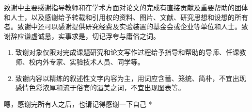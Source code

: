 \acknowledgments
\thispagestyle{fancy}%
致谢中主要感谢指导教师和在学术方面对论文的完成有直接贡献及重要帮助的团体和人士，以及感谢给予转载和引用权的资料、图片、文献、研究思想和设想的所有者。致谢中还可以感谢提供研究经费及实验装置的基金会或企业等单位和人士。致谢辞应谦虚诚恳，实事求是，切记浮夸与庸俗之词。

\begin{enumerate}[label=\arabic*)]
	\item 致谢对象仅限对完成课题研究和论文写作过程给予指导和帮助的导师、任课教师、校内外专家、实验技术人员、同学等。
	\item 致谢内容以精练的叙述性文字内容为主，用词应含蓄、笼统、简朴，不宜出现感情色彩浓厚和流于俗套的溢美之词，不宜出现图表等。
\end{enumerate}

\par * 嗯，感谢完所有人之后，也请记得感谢一下自己 * \par
\vspace{18em}
\parbox[t][1cm][b]{\textwidth}{\hspace{25em}{
		签名：\par}}
	
\parbox[t][1cm][b]{\textwidth}{}